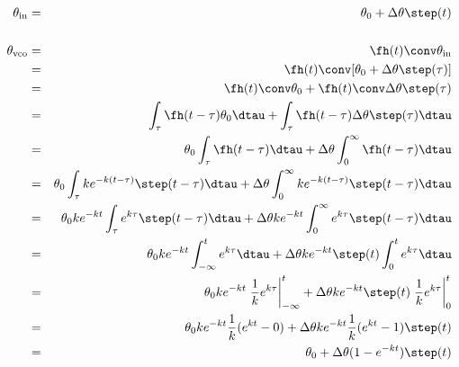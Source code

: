 \begin{eqnarray*}
  \theta_{\mathrm{in}} &=& \theta_0 + \Delta\theta\step(t)
\\
\\
  \theta_{\mathrm{vco}}
    &=& \fh(t) \conv \theta_{\mathrm{in}}
  \\&=& \fh(t) \conv [\theta_0 + \Delta\theta\step(\tau)]
  \\&=& \fh(t)\conv\theta_0 + \fh(t)\conv\Delta\theta\step(\tau)
  \\&=& \int_{\tau}\fh(t-\tau)\theta_0\dtau + \int_{\tau}\fh(t-\tau)\Delta\theta\step(\tau)\dtau
  \\&=& \theta_0\int_{\tau}\fh(t-\tau)\dtau + \Delta\theta\int_0^\infty\fh(t-\tau)\dtau
  \\&=& \theta_0\int_{\tau} k e^{-k(t-\tau)}\step(t-\tau)\dtau + 
        \Delta\theta\int_0^\infty ke^{-k(t-\tau)}\step(t-\tau) \dtau
  \\&=& \theta_0 k e^{-kt} \int_{\tau} e^{k\tau}\step(t-\tau)\dtau + 
        \Delta\theta ke^{-kt} \int_0^\infty e^{k\tau}\step(t-\tau) \dtau
  \\&=& \theta_0 k e^{-kt} \int_{-\infty}^t e^{k\tau}\dtau + 
        \Delta\theta ke^{-kt} \step(t) \int_0^t e^{k\tau} \dtau
  \\&=& \theta_0 k e^{-kt} \left. \frac{1}{k} e^{k\tau}\right|_{-\infty}^t + 
        \Delta\theta ke^{-kt} \step(t)  \left. \frac{1}{k} e^{k\tau}\right|_0^t
  \\&=& \theta_0 k e^{-kt} \frac{1}{k}(e^{kt}-0) + 
        \Delta\theta ke^{-kt} \frac{1}{k}(e^{kt}-1) \step(t) 
  \\&=& \theta_0  + \Delta\theta (1-e^{-kt}) \step(t) 
\end{eqnarray*}

